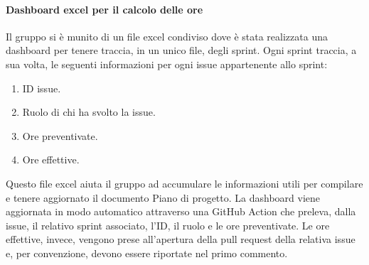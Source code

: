 \paragraph{Dashboard excel per il calcolo delle ore}
Il gruppo si è munito di un file excel condiviso dove è stata realizzata una dashboard per tenere traccia, in un unico file, degli sprint. Ogni sprint traccia, a sua volta, le seguenti informazioni per ogni issue appartenente allo sprint:
\begin{enumerate}
    \item ID issue.
    \item Ruolo di chi ha svolto la issue.
    \item Ore preventivate.
    \item Ore effettive.
\end{enumerate}
Questo file excel aiuta il gruppo ad accumulare le informazioni utili per compilare e tenere aggiornato il documento Piano di progetto.
La dashboard viene aggiornata in modo automatico attraverso una GitHub Action che preleva, dalla issue, il relativo sprint associato, l’ID,
 il ruolo e le ore preventivate. Le ore effettive, invece, vengono prese all'apertura della pull request della relativa issue e, per convenzione, devono essere riportate nel primo commento.

